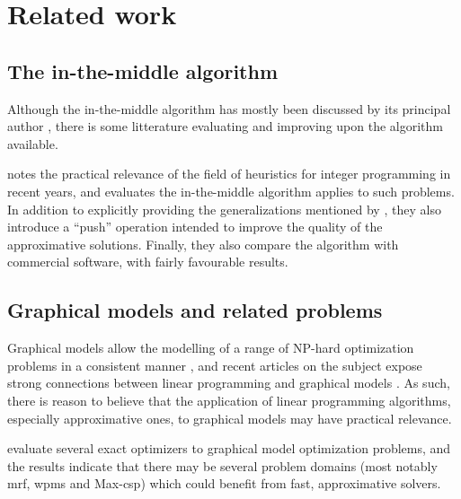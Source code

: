 \section{Related work}

\subsection{The in-the-middle algorithm}
Although the in-the-middle algorithm has mostly been discussed by its principal author \parencites{Wedelin95}{Wedelin08}{Wedelin13}{Alefragis00}, there is some litterature evaluating and improving upon the algorithm available.

\Textcite{Bastert10} notes the practical relevance of the field of heuristics for integer programming in recent years, and evaluates the in-the-middle algorithm applies to such problems. In addition to explicitly providing the generalizations mentioned by \textcite{Wedelin95}, they also introduce a \enquote{push} operation intended to improve the quality of the approximative solutions. Finally, they also compare the algorithm with commercial software, with fairly favourable results.


\subsection{Graphical models and related problems}
Graphical models allow the modelling of a range of NP-hard optimization problems in a consistent manner \parencite{deGivry14}, and recent articles on the subject expose strong connections between linear programming and graphical models \parencites{Werner07}{Kolmogorov13}.
As such, there is reason to believe that the application of linear programming algorithms, especially approximative ones, to graphical models may have practical relevance.

\Textcite{deGivry14} evaluate several exact optimizers to graphical model optimization problems, and the results indicate that there may be several problem domains (most notably \acrshort{mrf}, \acrshort{wpms} and Max-\acrshort{csp}) which could benefit from fast, approximative solvers.

